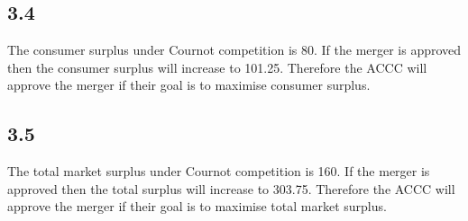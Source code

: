 \documentclass{article}
\begin{document}
\subsection*{3.4}
The consumer surplus under Cournot competition is 80. If the merger is approved then the consumer surplus will increase to 101.25. Therefore the ACCC will approve the merger if their goal is to maximise consumer surplus.

\subsection*{3.5}
The total market surplus under Cournot competition is 160. If the merger is approved then the total surplus will increase to 303.75. Therefore the ACCC will approve the merger if their goal is to maximise total market surplus.
\end{document}
